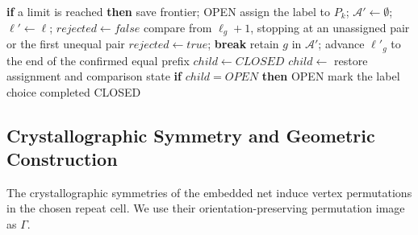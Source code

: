 \documentclass[a5paper, 10pt]{article}
\begin{document}
\begin{algorithm}[H]
\begin{algorithmic}[1]
    \State \textbf{if} a limit is reached \textbf{then} save frontier; \Return OPEN
    \State assign the label to $P_k$; $\mathcal A'\gets\emptyset$; $\boldsymbol\ell'\gets\boldsymbol\ell$; $rejected\gets false$
      \State compare from $\ell_g+1$, stopping at an unassigned pair or the first unequal pair
        \State $rejected\gets true$; \textbf{break}
        \State retain $g$ in $\mathcal A'$; advance $\ell'_g$ to the end of the confirmed equal prefix
      \EndIf
    \EndFor
    \State $child\gets CLOSED$
      \State $child\gets$ 
    \EndIf
    \State restore assignment and comparison state
    \State \textbf{if} $child=OPEN$ \textbf{then} \Return OPEN
    \State mark the label choice completed
  \EndFor
  \State \Return CLOSED
\EndFunction
\end{algorithmic}
\end{algorithm}

\subsection{Crystallographic Symmetry and Geometric Construction}



\label{sec:reconstruction_method}
The crystallographic symmetries of the embedded net induce vertex permutations in the chosen repeat cell. We use their orientation-preserving permutation image as $\Gamma$.
\end{document}
